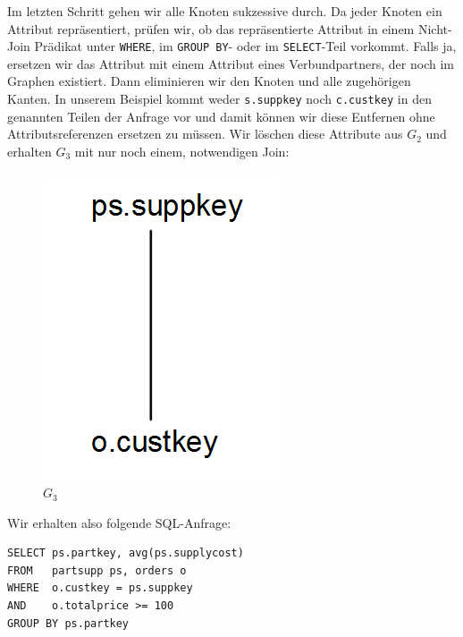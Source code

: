 Im letzten Schritt gehen wir alle Knoten sukzessive durch. Da jeder Knoten ein Attribut repräsentiert, prüfen wir, ob das repräsentierte Attribut in einem Nicht-Join Prädikat unter \verb|WHERE|, im \verb|GROUP BY|- oder im \verb|SELECT|-Teil vorkommt. Falls ja, ersetzen wir das Attribut mit einem Attribut eines Verbundpartners, der noch im Graphen existiert. Dann eliminieren wir den Knoten und alle zugehörigen Kanten. In unserem Beispiel kommt weder \verb|s.suppkey| noch \verb|c.custkey| in den genannten Teilen der Anfrage vor und damit können wir diese Entfernen ohne Attributsreferenzen ersetzen zu müssen. Wir löschen diese Attribute aus $G_2$ und erhalten $G_3$ mit nur noch einem, notwendigen Join:

\begin{figure}[H]
\centering
\includegraphics[scale=0.4]{Bilder/joinelem_g3.png}
\caption{$G_3$}
\end{figure}

Wir erhalten also folgende SQL-Anfrage:

\begin{lstlisting}[mathescape]
SELECT ps.partkey, avg(ps.supplycost)
FROM   partsupp ps, orders o
WHERE  o.custkey = ps.suppkey 
AND    o.totalprice >= 100
GROUP BY ps.partkey
\end{lstlisting}



